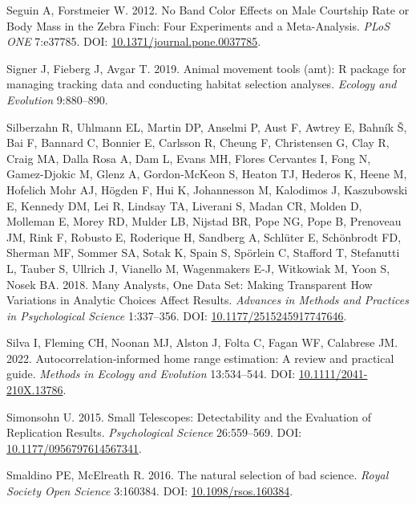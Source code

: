 \documentclass[10pt,a4paper]{article}
\newlength{\cslhangindent}
\newenvironment{CSLReferences}[2] %
 {\begin{list}{}{%
  \setlength{\itemindent}{0pt}
  \setlength{\leftmargin}{0pt}
  \setlength{\parsep}{0pt}
  \ifodd #1
   \setlength{\leftmargin}{\cslhangindent}
   \setlength{\itemindent}{-1\cslhangindent}
  \fi
  \setlength{\itemsep}{#2\baselineskip}}}
 {\end{list}}
\begin{document}
\begin{CSLReferences}{1}{0}
Seguin A, Forstmeier W. 2012. No {Band} {Color} {Effects} on {Male} {Courtship} {Rate} or {Body} {Mass} in the {Zebra} {Finch}: {Four} {Experiments} and a {Meta}-{Analysis}. \emph{PLoS ONE} 7:e37785. DOI: \href{https://doi.org/10.1371/journal.pone.0037785}{10.1371/journal.pone.0037785}.

Signer J, Fieberg J, Avgar T. 2019. Animal movement tools (amt): R package for managing tracking data and conducting habitat selection analyses. \emph{Ecology and Evolution} 9:880--890.

Silberzahn R, Uhlmann EL, Martin DP, Anselmi P, Aust F, Awtrey E, Bahník Š, Bai F, Bannard C, Bonnier E, Carlsson R, Cheung F, Christensen G, Clay R, Craig MA, Dalla Rosa A, Dam L, Evans MH, Flores Cervantes I, Fong N, Gamez-Djokic M, Glenz A, Gordon-McKeon S, Heaton TJ, Hederos K, Heene M, Hofelich Mohr AJ, Högden F, Hui K, Johannesson M, Kalodimos J, Kaszubowski E, Kennedy DM, Lei R, Lindsay TA, Liverani S, Madan CR, Molden D, Molleman E, Morey RD, Mulder LB, Nijstad BR, Pope NG, Pope B, Prenoveau JM, Rink F, Robusto E, Roderique H, Sandberg A, Schlüter E, Schönbrodt FD, Sherman MF, Sommer SA, Sotak K, Spain S, Spörlein C, Stafford T, Stefanutti L, Tauber S, Ullrich J, Vianello M, Wagenmakers E-J, Witkowiak M, Yoon S, Nosek BA. 2018. Many {Analysts}, {One} {Data} {Set}: {Making} {Transparent} {How} {Variations} in {Analytic} {Choices} {Affect} {Results}. \emph{Advances in Methods and Practices in Psychological Science} 1:337--356. DOI: \href{https://doi.org/10.1177/2515245917747646}{10.1177/2515245917747646}.

Silva I, Fleming CH, Noonan MJ, Alston J, Folta C, Fagan WF, Calabrese JM. 2022. Autocorrelation‐informed home range estimation: {A} review and practical guide. \emph{Methods in Ecology and Evolution} 13:534--544. DOI: \href{https://doi.org/10.1111/2041-210X.13786}{10.1111/2041-210X.13786}.

Simonsohn U. 2015. Small {Telescopes}: {Detectability} and the {Evaluation} of {Replication} {Results}. \emph{Psychological Science} 26:559--569. DOI: \href{https://doi.org/10.1177/0956797614567341}{10.1177/0956797614567341}.

Smaldino PE, McElreath R. 2016. The natural selection of bad science. \emph{Royal Society Open Science} 3:160384. DOI: \href{https://doi.org/10.1098/rsos.160384}{10.1098/rsos.160384}.


\end{CSLReferences}
\end{document}
